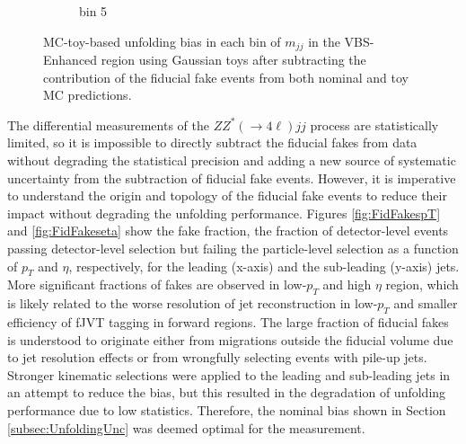 \begin{figure}[htb]
\begin{subfigure}{.48\textwidth}
        \caption{bin 5 }
    \end{subfigure}
    \caption{ MC-toy-based unfolding bias in each bin of $m_{jj}$ in the VBS-Enhanced region using Gaussian toys after subtracting the contribution of the fiducial fake events from both nominal and toy MC predictions.\label{fig:UnfoldingBias_mjj_VBSEnhanced_noFakes}}
\end{figure}

The differential measurements of the $ZZ^*(\rightarrow 4\ell)jj$ process are statistically limited, so it is impossible to directly subtract the fiducial fakes from data without degrading the statistical precision and adding a new source of systematic uncertainty from the subtraction of fiducial fake events. However, it is imperative to understand the origin and topology of the fiducial fake events to reduce their impact without degrading the unfolding performance. Figures \ref{fig:FidFakespT} and \ref{fig:FidFakeseta} show the fake fraction, the fraction of detector-level events passing detector-level selection but failing the particle-level selection as a function of $p_{T}$ and $\eta$, respectively, for the leading (x-axis) and the sub-leading (y-axis) jets. More significant fractions of fakes are observed in low-$p_{T}$ and high $\eta$ region, which is likely related to the worse resolution of jet reconstruction in low-$p_{T}$ and smaller efficiency of fJVT tagging in forward regions. The large fraction of fiducial fakes is understood to originate either from migrations outside the fiducial volume due to jet resolution effects or from wrongfully selecting events with pile-up jets. Stronger kinematic selections were applied to the leading and sub-leading jets in an attempt to reduce the bias, but this resulted in the degradation of unfolding performance due to low statistics. Therefore, the nominal bias shown in Section \ref{subsec:UnfoldingUnc} was deemed optimal for the measurement. 

